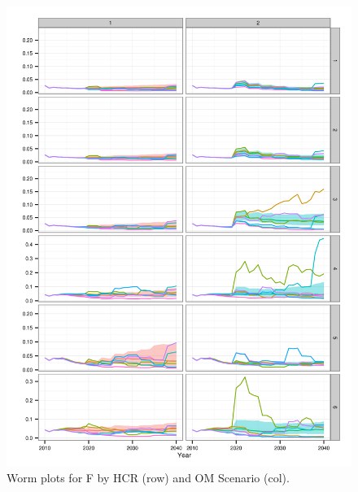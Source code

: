 \documentclass[a4paper, 10pt]{article}
\begin{document}
\begin{figure}[htbp]
\centering
\includegraphics[width=6in]{iF.png}
\caption{Worm plots for F by HCR (row) and OM Scenario (col).}
\label{fig:4}
\end{figure}
\end{document}
